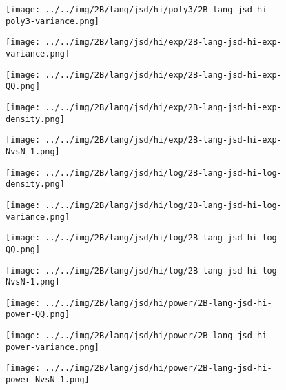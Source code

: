 \begin{figure}[H]
\centering	\texttt{[image: ../../img/2B/lang/jsd/hi/poly3/2B-lang-jsd-hi-poly3-variance.png]}
\end{figure}
\begin{figure}[H]
\centering	\texttt{[image: ../../img/2B/lang/jsd/hi/exp/2B-lang-jsd-hi-exp-variance.png]}
\end{figure}
\begin{figure}[H]
\centering	\texttt{[image: ../../img/2B/lang/jsd/hi/exp/2B-lang-jsd-hi-exp-QQ.png]}
\end{figure}
\begin{figure}[H]
\centering	\texttt{[image: ../../img/2B/lang/jsd/hi/exp/2B-lang-jsd-hi-exp-density.png]}
\end{figure}
\begin{figure}[H]
\centering	\texttt{[image: ../../img/2B/lang/jsd/hi/exp/2B-lang-jsd-hi-exp-NvsN-1.png]}
\end{figure}
\begin{figure}[H]
\centering	\texttt{[image: ../../img/2B/lang/jsd/hi/log/2B-lang-jsd-hi-log-density.png]}
\end{figure}
\begin{figure}[H]
\centering	\texttt{[image: ../../img/2B/lang/jsd/hi/log/2B-lang-jsd-hi-log-variance.png]}
\end{figure}
\begin{figure}[H]
\centering	\texttt{[image: ../../img/2B/lang/jsd/hi/log/2B-lang-jsd-hi-log-QQ.png]}
\end{figure}
\begin{figure}[H]
\centering	\texttt{[image: ../../img/2B/lang/jsd/hi/log/2B-lang-jsd-hi-log-NvsN-1.png]}
\end{figure}
\begin{figure}[H]
\centering	\texttt{[image: ../../img/2B/lang/jsd/hi/power/2B-lang-jsd-hi-power-QQ.png]}
\end{figure}
\begin{figure}[H]
\centering	\texttt{[image: ../../img/2B/lang/jsd/hi/power/2B-lang-jsd-hi-power-variance.png]}
\end{figure}
\begin{figure}[H]
\centering	\texttt{[image: ../../img/2B/lang/jsd/hi/power/2B-lang-jsd-hi-power-NvsN-1.png]}
\end{figure}
